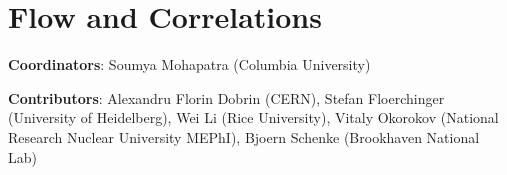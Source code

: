 \documentclass[../report.tex]{subfiles}
\providecommand{\main}{..}
\begin{document}
\section{Flow and Correlations}

\noindent \textbf{Coordinators}: Soumya Mohapatra (Columbia University)


\noindent \textbf{Contributors}: Alexandru Florin Dobrin (CERN), Stefan Floerchinger (University of Heidelberg), Wei Li (Rice University), Vitaly Okorokov (National Research Nuclear University MEPhI), Bjoern Schenke (Brookhaven National Lab)

\FloatBarrier
\FloatBarrier



\FloatBarrier
%
\FloatBarrier
%


\FloatBarrier
\FloatBarrier
\FloatBarrier
\FloatBarrier
\end{document}
